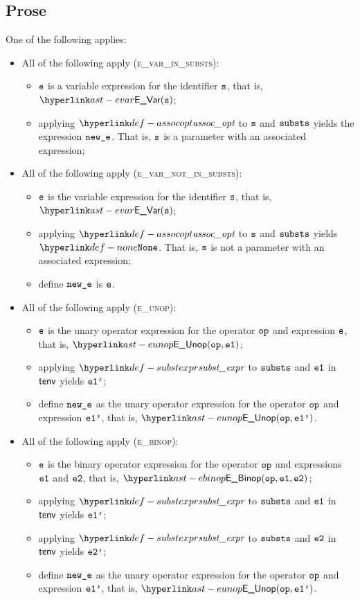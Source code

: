 \subsection{Prose}
One of the following applies:
\begin{itemize}
  \item All of the following apply (\textsc{e\_var\_in\_substs}):
  \begin{itemize}
    \item $\texttt{e}$ is a variable expression for the identifier $\texttt{s}$, that is, $\EVar(\vs)$;
    \item applying $\assocopt$ to $\texttt{s}$ and $\texttt{substs}$ yields the expression $\texttt{new\_e}$.
          That is, $\texttt{s}$ is a parameter with an associated expression;
  \end{itemize}

  \item All of the following apply (\textsc{e\_var\_not\_in\_substs}):
  \begin{itemize}
    \item $\texttt{e}$ is the variable expression for the identifier $\texttt{s}$, that is, $\EVar(\vs)$;
    \item applying $\assocopt$ to $\texttt{s}$ and $\texttt{substs}$ yields $\None$.
          That is, $\texttt{s}$ is not a parameter with an associated expression;
    \item define $\texttt{new\_e}$ is $\texttt{e}$.
  \end{itemize}

  \item All of the following apply (\textsc{e\_unop}):
  \begin{itemize}
    \item $\texttt{e}$ is the unary operator expression for the operator $\texttt{op}$ and expression $\texttt{e}$, that is, $\EUnop(\op, \veone)$;
    \item applying $\substexpr$ to $\texttt{substs}$ and $\texttt{e1}$ in $\textsf{tenv}$ yields $\texttt{e1'}$;
    \item define $\texttt{new\_e}$ as the unary operator expression for the operator $\texttt{op}$ and expression $\texttt{e1'}$, that is, $\EUnop(\op, \veonep)$.
  \end{itemize}

  \item All of the following apply (\textsc{e\_binop}):
  \begin{itemize}
    \item $\texttt{e}$ is the binary operator expression for the operator $\texttt{op}$ and expressions $\texttt{e1}$ and $\texttt{e2}$, that is, $\EBinop(\op, \veone, \vetwo)$;
    \item applying $\substexpr$ to $\texttt{substs}$ and $\texttt{e1}$ in $\textsf{tenv}$ yields $\texttt{e1'}$;
    \item applying $\substexpr$ to $\texttt{substs}$ and $\texttt{e2}$ in $\textsf{tenv}$ yields $\texttt{e2'}$;
    \item define $\texttt{new\_e}$ as the unary operator expression for the operator $\texttt{op}$ and expression $\texttt{e1'}$, that is, $\EUnop(\op, \veonep)$.
  \end{itemize}


\end{itemize}

